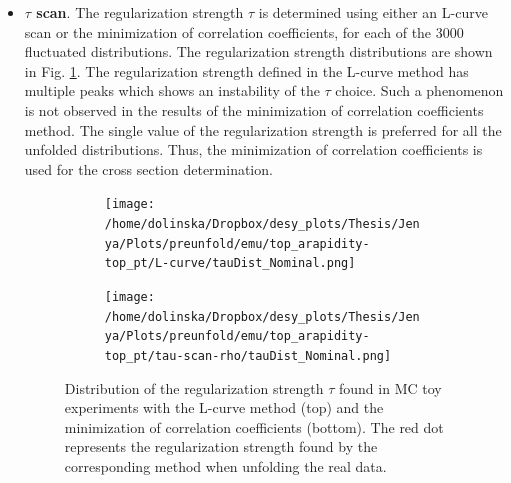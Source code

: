 \begin{itemize}

 \item \textbf{$\tau$ scan}. The regularization strength $\tau$ is determined using either an L-curve scan or the minimization of correlation coefficients, for each
 of the 3000 fluctuated distributions. The regularization strength distributions are shown in
 Fig. \ref{fig:tau_scan}. The regularization strength defined in the L-curve method has multiple peaks which shows an instability of the $\tau$ choice.
 Such a phenomenon is not observed in the results of the minimization of correlation coefficients method. The single value of the regularization strength
 is preferred for all the unfolded distributions. Thus, the minimization of correlation coefficients is used for the cross section determination.
 \begin{figure}[p]
 \centering
 \begin{subfigure}
  \centering
  \texttt{[image: /home/dolinska/Dropbox/desy\_plots/Thesis/Jenya/Plots/preunfold/emu/top\_arapidity-top\_pt/L-curve/tauDist\_Nominal.png]}
 \end{subfigure}
 \begin{subfigure}
  \centering
  \texttt{[image: /home/dolinska/Dropbox/desy\_plots/Thesis/Jenya/Plots/preunfold/emu/top\_arapidity-top\_pt/tau-scan-rho/tauDist\_Nominal.png]}
 \end{subfigure}
 \caption{Distribution of the regularization strength $\tau$ found in MC toy experiments with the L-curve method (top) and the minimization of correlation coefficients
         (bottom). The red dot represents the regularization strength found by the corresponding method when unfolding the real data.}
 \label{fig:tau_scan}
 \end{figure}
 

\end{itemize}
